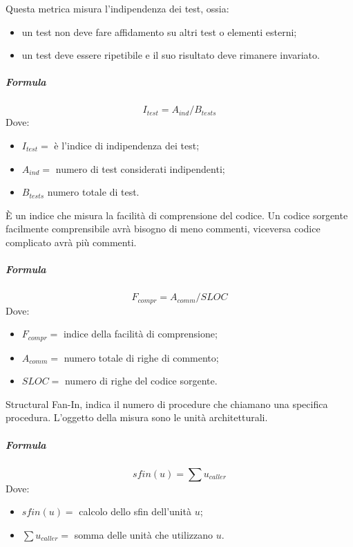         Questa metrica misura l'indipendenza dei test, ossia:
        \begin{itemize}
          \item un test non deve fare affidamento su altri test o elementi esterni;
          \item un test deve essere ripetibile e il suo risultato deve rimanere 
        invariato.
        \end{itemize}
        \subparagraph{Formula}
        \begin{displaymath}
          I_{test} = A_{ind}/B_{tests}
        \end{displaymath}
        Dove:
        \begin{itemize}
          \item[] $I_{test} =$ è l'indice di indipendenza dei test;
          \item[] $A_{ind} =$ numero di test considerati indipendenti;
          \item[] $B_{tests}$ numero totale di test.
        \end{itemize}
        
        È un indice che misura la facilità di comprensione del codice. Un codice 
        sorgente facilmente comprensibile avrà bisogno di meno commenti, viceversa 
        codice complicato avrà più commenti.
        \subparagraph{Formula}
        \begin{displaymath}
          F_{compr} = A_{comm}/SLOC
        \end{displaymath}
        Dove:
        \begin{itemize}
          \item[] $F_{compr} =$ indice della facilità di comprensione;
          \item[] $A_{comm} =$ numero totale di righe di commento;
          \item[] $SLOC =$ numero di righe del codice sorgente.
        \end{itemize}
        
        Structural Fan-In, indica il numero di procedure che chiamano una specifica 
        procedura. L'oggetto della misura sono le unità architetturali.
        \subparagraph{Formula}
        \begin{displaymath}
          sfin(u) =  \sum u_{caller}
        \end{displaymath}
        Dove:
        \begin{itemize}
          \item[] $sfin(u) =$ calcolo dello sfin dell'unità $u$;
          \item[] $\sum u_{caller} =$ somma delle unità che utilizzano $u$.
        \end{itemize}
        
